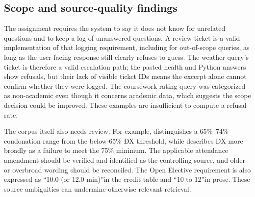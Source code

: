 \documentclass[11pt,a4paper]{article}
\begin{document}
\subsection{Scope and source-quality findings}
The assignment requires the system to say it does not know for unrelated questions and to keep a log of unanswered questions. A review ticket is a valid implementation of that logging requirement, including for out-of-scope queries, as long as the user-facing response still clearly refuses to guess. The weather query's ticket is therefore a valid escalation path; the pasted health and Python answers show refusals, but their lack of visible ticket IDs means the excerpt alone cannot confirm whether they were logged. The coursework-rating query was categorized as non-academic even though it concerns academic data, which suggests the scope decision could be improved. These examples are insufficient to compute a refusal rate.

The corpus itself also needs review. For example,  distinguishes a 65\%--74\% condonation range from the below-65\% DX threshold, while  describes DX more broadly as a failure to meet the 75\% minimum. The applicable attendance amendment should be verified and identified as the controlling source, and older or overbroad wording should be reconciled. The Open Elective requirement is also expressed as \textquotedblleft 10.0 (or 12.0 min)\textquotedblright in the credit table and \textquotedblleft 10 to 12\textquotedblright in prose. These source ambiguities can undermine otherwise relevant retrieval.
\end{document}
